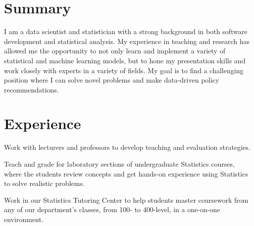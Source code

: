 \documentclass[letterpaper]{deedy-resume} %
\begin{document}
\begin{minipage}[t]{0.35\textwidth}

\end{minipage} %
\hfill
%
%
\begin{minipage}[t]{0.63\textwidth} %
\section{Summary}
I am a data scientist and statistician with a strong background in
both software development and statistical analysis.  My experience in
teaching and research has allowed me the opportunity to not only learn
and implement a variety of statistical and machine learning models,
but to hone my presentation skills and work closely with experts in a
variety of fields.  My goal is to find a challenging
position where I can solve novel problems and make data-driven
policy recommendations.


\section{Experience}

\vspace{\topsep} %
\begin{tightitemize}
\item Work with lecturers and professors to develop
  teaching and evaluation strategies.
\item Teach and grade for laboratory sections of undergraduate Statistics
  courses, where the students review concepts and get hands-on experience
  using Statistics to solve realistic
  problems. 
\item Work in our Statistics Tutoring
  Center to help students master 
  coursework from any of our department's classes, from 100- to
  400-level, in a one-on-one environment.
\end{tightitemize}


\end{minipage}
\end{document}
